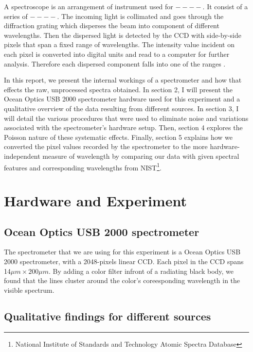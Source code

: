 \documentclass[authoryear, 12pt,5p, times]{elsarticle}
\begin{document}
A spectroscope is an arrangement of instrument used for $----$.  It consist of a series of $----$. The incoming light is collimated and goes through the diffraction grating which disperses the beam into component of different wavelengths.  Then the dispersed light is detected by the CCD with side-by-side pixels that span a fixed range of wavelengths. The intensity value incident on each pixel is converted into digital units and read to a computer for further analysis.  Therefore each dispersed component falls into one of the ranges .

In this report, we present the internal workings of a spectrometer and how that effects the raw, unprocessed spectra obtained. In section 2, I will present the Ocean Optics USB 2000 spectrometer hardware used for this experiment and a qualitative overview of the data resulting from different sources. In section 3, I will detail the various procedures that were used to eliminate noise and variations associated with the spectrometer's hardware setup.  Then, section 4 explores the Poisson nature of these systematic effects. Finally, section 5 explains how we converted the pixel values recorded by the spectrometer to the more hardware-independent measure of wavelength by comparing our data with given spectral features  and corresponding wavelengths from NIST\footnote{National Institute of Standards and Technology Atomic Spectra Database}.
\section{Hardware and Experiment}
	\subsection{Ocean Optics USB 2000 spectrometer}
The spectrometer that we are using for this experiment is a Ocean Optics USB 2000 spectrometer, with a 2048-pixels linear CCD. Each pixel in the CCD spans 14$\mu m\times 200\mu m$.
By adding a color filter infront of a radiating black body, we found that the lines cluster around the color's coreesponding wavelength in the visible spectrum.
	\subsection{Qualitative findings for different sources}
\end{document}
